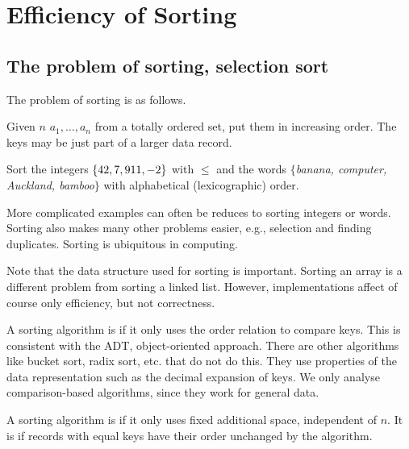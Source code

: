 \part{Efficiency of Sorting}  
\label{ch:effsort}

\chapter{The problem of sorting, selection sort} %
\label{sec:sortingproblem}
The problem of sorting is as follows. 
\begin{Definition}
Given $n$  $a_1, \dots , a_n$ from a totally ordered set, put them in increasing order. 
The keys may be just part of a larger data record.
\end{Definition}
\begin{Boxample}[2]
Sort the integers $\mbox{$\{42, 7, 911, -2\}$}$ with $\leq$ 
and the words $\{$\textit{banana, computer, Auckland, bamboo}$\}$ with  alphabetical (lexicographic) order.
\end{Boxample}
More complicated examples can often be reduces to sorting integers or words.
Sorting also makes many other problems easier, e.g., selection and finding duplicates.
Sorting is ubiquitous in computing. 

Note that the data structure used for sorting is important. 
Sorting an array is a different problem from sorting a linked list. 
However, implementations affect of course only efficiency, but not correctness.  

\begin{Definition}
A sorting algorithm is  if it only uses the order relation to compare keys.
This is consistent with the ADT, object-oriented approach. 
There are other algorithms like bucket sort, radix sort, etc. that do not do this. 
They use properties of the data representation such as the decimal expansion of keys.
We only analyse comparison-based algorithms, since they work for general data.
\end{Definition}

\begin{Definition}
A sorting algorithm is  if it only uses fixed additional space, independent of $n$.
It is  if records with equal keys have their order unchanged by the algorithm.
\end{Definition}

